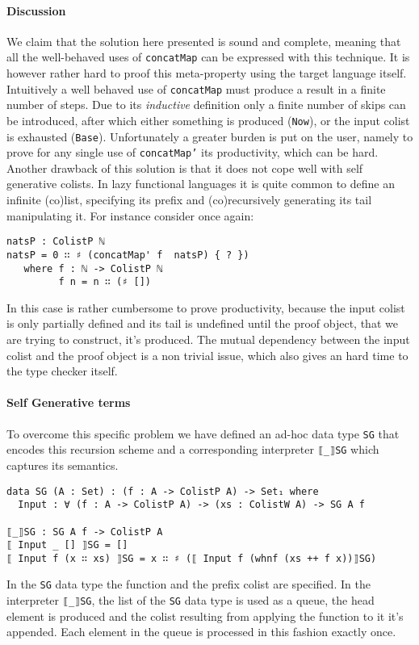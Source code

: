 \documentclass[10pt,a4paper]{article}
\begin{document}
\paragraph{Discussion}
We claim that the solution here presented is sound and complete, meaning that all the well-behaved uses of \texttt{concatMap} can be expressed with this technique. It is however rather hard to proof this meta-property using the target language itself. Intuitively a well behaved use of \texttt{concatMap} must produce a result in a finite number of steps. Due to its \emph{inductive} definition only a finite number of skips can be introduced, after which either something is produced (\texttt{Now}), or the input colist is exhausted (\texttt{Base}).
Unfortunately a greater burden is put on the user, namely to prove for any single use of \texttt{concatMap'} its productivity, which can be hard. %
Another drawback of this solution is that it does not cope well with self generative colists. In lazy functional languages it is quite common to define an infinite (co)list, specifying its prefix and (co)recursively generating its tail manipulating it. For instance consider once again:
\begin{verbatim}
natsP : ColistP ℕ
natsP = 0 ∷ ♯ (concatMap' f  natsP) { ? })
   where f : ℕ -> ColistP ℕ
         f n = n ∷ (♯ [])
\end{verbatim}
In this case is rather cumbersome to prove productivity, because the input colist is only partially defined and its tail is undefined until the proof object, that we are trying to construct, it's produced.
The mutual dependency between the input colist and the proof object is a non trivial issue, which also gives an hard time to the type checker itself.

\paragraph{Self Generative terms}
To overcome this specific problem we have defined an ad-hoc data type \texttt{SG} that encodes this recursion scheme and a corresponding interpreter \texttt{⟦\_⟧SG} which captures its semantics. 
\begin{verbatim}
data SG (A : Set) : (f : A -> ColistP A) -> Set₁ where
  Input : ∀ (f : A -> ColistP A) -> (xs : ColistW A) -> SG A f
  
⟦_⟧SG : SG A f -> ColistP A
⟦ Input _ [] ⟧SG = []
⟦ Input f (x ∷ xs) ⟧SG = x ∷ ♯ (⟦ Input f (whnf (xs ++ f x))⟧SG)
\end{verbatim}
In the \texttt{SG} data type the function and the prefix colist are specified.
In the interpreter \texttt{⟦\_⟧SG}, the list of the \texttt{SG} data type is used as a queue, the head element is produced and the colist resulting from applying the function to it it's appended. Each element in the queue is processed in this fashion exactly once.
\end{document}
